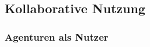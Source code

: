 \subsection{Kollaborative Nutzung}
\label{ssec:ea-kollaborative_nutzung}

\subsubsection{Agenturen als Nutzer}
\label{sssec:eak-agenturen-als-nutzer}
